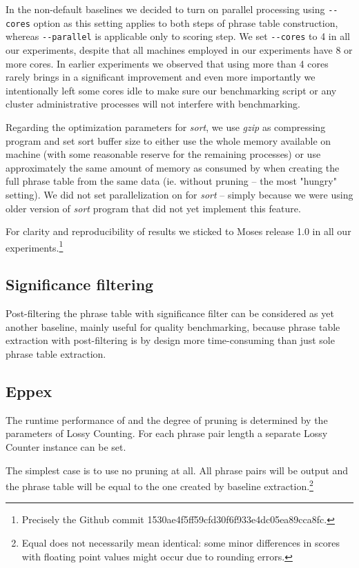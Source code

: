 In the non-default baselines we decided to turn on parallel processing using \verb|--cores|
option as this setting applies to both steps of phrase table construction, whereas
\verb|--parallel| is applicable only to scoring step.
We set \verb|--cores| to 4 in all our experiments, despite that all machines employed in
our experiments have 8 or more cores.
In earlier experiments we observed that using more than 4 cores rarely brings in
a significant improvement and even more importantly we intentionally left some cores
idle to make sure our benchmarking script or any cluster administrative processes
will not interfere with benchmarking.

Regarding the optimization parameters for \emph{sort}, we use \emph{gzip} as compressing
program and set sort buffer size to either use the whole memory available on machine
(with some reasonable reserve for the remaining processes) or use approximately the same
amount of memory as consumed by \eppex{} when creating the full phrase table from
the same data (ie. without pruning -- the most "hungry" setting).
We did not set parallelization on for \emph{sort} -- simply because we were using older
version of \emph{sort} program that did not yet implement this feature.

For clarity and reproducibility of results we sticked to Moses release 1.0 in all our 
experiments.\footnote{Precisely the Github commit 1530ae4f5ff59cfd30f6f933e4dc05ea89cca8fc.}

\subsection{Significance filtering}

Post-filtering the phrase table with significance filter can be considered as
yet another baseline, mainly useful for quality benchmarking, because
phrase table extraction with post-filtering is by design more time-consuming
than just sole phrase table extraction.

\subsection{Eppex}

The runtime performance of \eppex{} and the degree of pruning is determined
by the parameters of Lossy Counting.
For each phrase pair length a separate Lossy Counter instance can be set.

The simplest case is to use no pruning at all. All phrase pairs will be
output and the phrase table will be equal to the one created by baseline
extraction.\footnote{Equal does not necessarily mean identical: some minor
differences in scores with floating point values might occur due to rounding
errors.}

